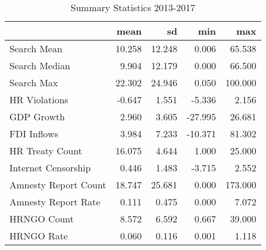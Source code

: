 \begin{table}[ht]
\centering
\begin{tabular}{|l|rrrr|}
  \hline
 & mean & sd & min & max \\ 
  \hline
Search Mean & 10.258 & 12.248 & 0.006 & 65.538 \\ 
  Search Median & 9.904 & 12.179 & 0.000 & 66.500 \\ 
  Search Max & 22.302 & 24.946 & 0.050 & 100.000 \\ 
  HR Violations & -0.647 & 1.551 & -5.336 & 2.156 \\ 
  GDP Growth & 2.960 & 3.605 & -27.995 & 26.681 \\ 
  FDI Inflows & 3.984 & 7.233 & -10.371 & 81.302 \\ 
  HR Treaty Count & 16.075 & 4.644 & 1.000 & 25.000 \\ 
  Internet Censorship & 0.446 & 1.483 & -3.715 & 2.552 \\ 
  Amnesty Report Count & 18.747 & 25.681 & 0.000 & 173.000 \\ 
  Amnesty Report Rate & 0.111 & 0.475 & 0.000 & 7.072 \\ 
  HRNGO Count & 8.572 & 6.592 & 0.667 & 39.000 \\ 
  HRNGO Rate & 0.060 & 0.116 & 0.001 & 1.118 \\ 
   \hline
\end{tabular}
\caption{Summary Statistics 2013-2017} 
\end{table}
